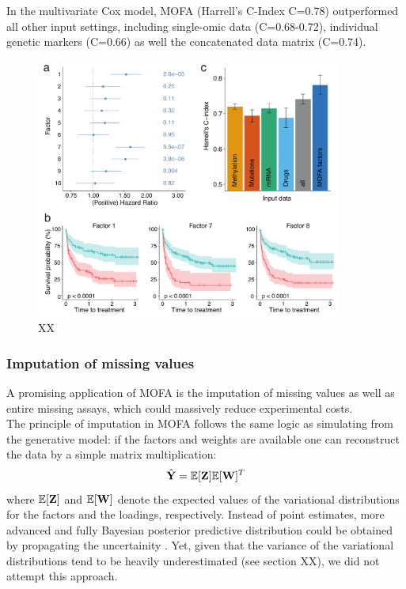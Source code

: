 In the multivariate Cox model, MOFA (Harrell's C-Index C=0.78) outperformed all other input settings, including single-omic data (C=0.68-0.72), individual genetic markers (C=0.66) as well the concatenated data matrix (C=0.74).


\begin{figure}[H]
	\centering 	
	\includegraphics[width=0.9\textwidth]{MOFA_CLL_Cox}
	\caption{XX}
	\label{fig:MOFA_CLL_Cox}
\end{figure}


\subsubsection{Imputation of missing values}

A promising application of MOFA is the imputation of missing values as well as entire missing assays, which could massively reduce experimental costs.\\
The principle of imputation in MOFA follows the same logic as simulating from the generative model: if the factors and weights are available one can reconstruct the data by a simple matrix multiplication:
\[
	\hat{{\bf Y}} = \mathbb{E}[{\bf Z}] \mathbb{E}[{\bf W}]^T
\]
where $\mathbb{E}[{\bf Z}]$ and $\mathbb{E}[{\bf W}]$ denote the expected values of the variational distributions for the factors and the loadings, respectively. Instead of point estimates, more advanced and fully Bayesian posterior predictive distribution could be obtained by propagating the uncertainity \cite{Gelman2013}. Yet, given that the variance of the variational distributions tend to be heavily underestimated (see section XX), we did not attempt this approach.\\

